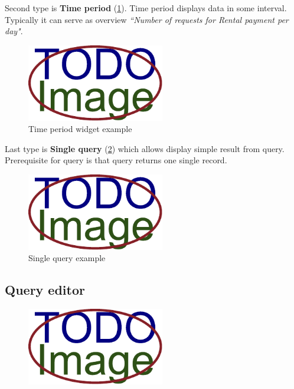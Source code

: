    	Second type is \textbf{Time period} (\cref{fig:widget-time-period}). Time period displays data in some interval. Typically it can serve as overview \textit{``Number of requests for Rental payment per day"}.        
      
      \begin{figure}[ht!]
          \centering
          \includegraphics[width=6cm,keepaspectratio]{img/TODO-image}
          \caption{Time period widget example}
          \label{fig:widget-time-period}
      \end{figure}
    
    Last type is \textbf{Single query} (\cref{fig:widget-single-query}) which allows display simple result from query. Prerequisite for query is that query returns one single record. 
      
      \begin{figure}[ht!]
          \centering
          \includegraphics[width=6cm,keepaspectratio]{img/TODO-image}
          \caption{Single query example}
           \label{fig:widget-single-query}
      \end{figure}       
    
    \subsection{Query editor}
    
    
    \begin{figure}[ht!]
          \centering
          \includegraphics[width=6cm,keepaspectratio]{img/TODO-image}
          \caption{}
      \end{figure}   
    
